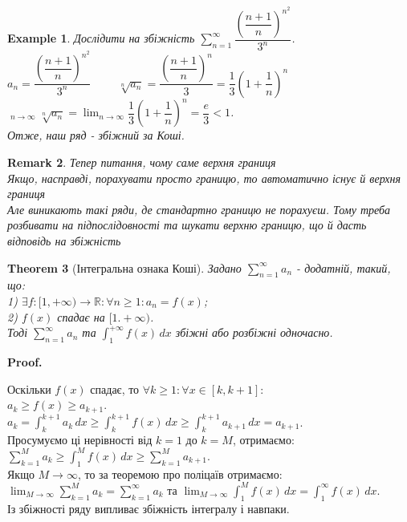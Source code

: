 \documentclass[a4paper, 10pt]{article}
\makeatletter
\DeclareMathOperator*\uplim{\overline{lim}}
\def\huge{\displaystyle}
\def\qed{$\blacksquare$}
\theoremstyle{theoremdd}
\newtheorem{theorem}{Theorem}[subsection]
\theoremstyle{theoremdd}
\theoremstyle{theoremdd}
\theoremstyle{theoremdd}
\newtheorem{example}[theorem]{Example}
\theoremstyle{theoremdd}
\theoremstyle{theoremdd}
\newtheorem{remark}[theorem]{Remark}
\theoremstyle{theoremdd}
\theoremstyle{theoremdd}
\renewenvironment{proof}[1][Proof.\\]{\par
\pushQED{\hfill \qed}%
\normalfont \topsep6\p@\@plus6\p@\relax
\trivlist
\item\relax
{\bfseries
#1\@addpunct{.}}\hspace\labelsep\ignorespaces
}{%
\popQED\endtrivlist\@endpefalse
}
\makeatother
\begin{document}
\begin{example}
Дослідити на збіжність $\huge\sum_{n=1}^\infty \dfrac{\left( \dfrac{n+1}{n} \right)^{n^2}}{3^n}$.\\
$a_n = \dfrac{\left( \dfrac{n+1}{n} \right)^{n^2}}{3^n} \hspace{1cm} \sqrt[n]{a_n} = \dfrac{\left( \dfrac{n+1}{n} \right)^n}{3} = \dfrac{1}{3} \left( 1 + \dfrac{1}{n} \right)^n$\\
$\huge\uplim_{n \to \infty} \sqrt[n]{a_n} = \lim_{n \to \infty} \dfrac{1}{3} \left( 1 + \dfrac{1}{n} \right)^n = \dfrac{e}{3} < 1$.\\
Отже, наш ряд - збіжний за Коші.
\end{example}

\begin{remark}
Тепер питання, чому саме верхня границя\\
Якщо, насправді, порахувати просто границю, то автоматично існує й верхня границя\\
Але виникають такі ряди, де стандартно границю не порахуєш. Тому треба розбивати на підпослідовності та шукати верхню границю, що й дасть відповідь на збіжність
\end{remark}

\begin{theorem}[Інтегральна ознака Коші]
Задано $\huge \sum_{n=1}^{\infty} a_n$ - додатній, такий, що:\\
1) $\exists f: [1,+\infty) \to \mathbb{R}: \forall n \geq 1: a_n = f(x)$;\\
2) $f(x)$ спадає на $[1.+\infty)$.\\
Тоді $\huge \sum_{n = 1}^\infty a_n$ та $\huge \int_1^{+\infty} f(x)\,dx$ збіжні або розбіжні одночасно.
\end{theorem}

\begin{proof}
Оскільки $f(x)$ спадає, то $\forall k \geq 1: \forall x \in [k, k+1]:$\\
$a_k \geq f(x) \geq a_{k+1}$.\\
$\huge a_k = \int_k^{k+1} a_k \,dx \geq \int_k^{k+1} f(x)\,dx \geq \int_k^{k+1} a_{k+1}\,dx = a_{k+1}$.\\
Просумуємо ці нерівності від $k = 1$ до $k = M$, отримаємо:\\
$\huge \sum_{k=1}^M a_k \geq \int_1^{M} f(x)\,dx \geq \sum_{k=1}^M a_{k+1}$.\\
Якщо $M \to \infty$, то за теоремою про поліцаїв отримаємо:\\
$\huge \lim_{M \to \infty}  \sum_{k=1}^M a_{k} = \sum_{k=1}^{\infty} a_k$ та $\huge \lim_{M \to \infty} \int_1^M f(x)\,dx = \int_1^\infty f(x)\,dx$.\\
Із збіжності ряду випливає збіжність інтегралу і навпаки.
\end{proof}
\end{document}
